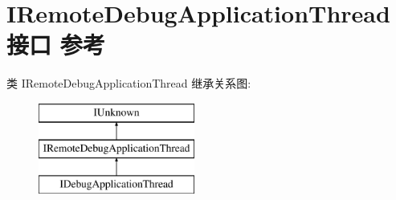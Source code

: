 \hypertarget{interface_i_remote_debug_application_thread}{}\section{I\+Remote\+Debug\+Application\+Thread接口 参考}
\label{interface_i_remote_debug_application_thread}
类 I\+Remote\+Debug\+Application\+Thread 继承关系图\+:\begin{figure}[H]
\begin{center}
\leavevmode
\includegraphics[height=3.000000cm]{interface_i_remote_debug_application_thread}
\end{center}
\end{figure}
